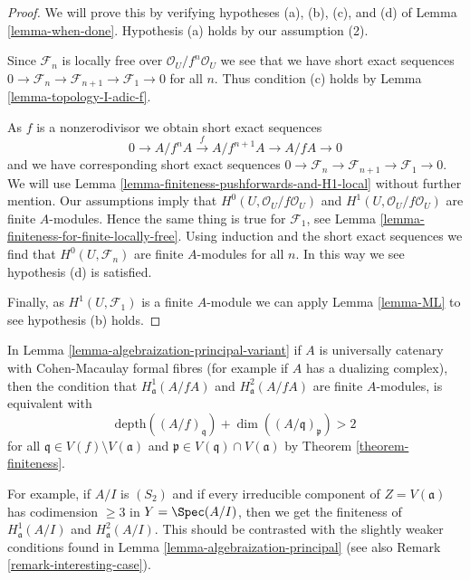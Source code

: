 \begin{proof}
We will prove this by verifying hypotheses (a), (b), (c), and (d) of
Lemma \ref{lemma-when-done}. Hypothesis (a) holds by our assumption (2).

\medskip\noindent
Since $\mathcal{F}_n$ is locally free over $\mathcal{O}_U/f^n\mathcal{O}_U$
we see that we have short exact sequences
$0 \to \mathcal{F}_n \to \mathcal{F}_{n + 1} \to \mathcal{F}_1 \to 0$
for all $n$. Thus condition (c) holds by Lemma \ref{lemma-topology-I-adic-f}.

\medskip\noindent
As $f$ is a nonzerodivisor we obtain short exact sequences
$$
0 \to A/f^nA \xrightarrow{f} A/f^{n + 1}A \to A/fA \to 0
$$
and we have corresponding short exact sequences
$0 \to \mathcal{F}_n \to \mathcal{F}_{n + 1} \to \mathcal{F}_1 \to 0$.
We will use Lemma \ref{lemma-finiteness-pushforwards-and-H1-local}
without further mention. Our assumptions imply that
$H^0(U, \mathcal{O}_U/f\mathcal{O}_U)$ and
$H^1(U, \mathcal{O}_U/f\mathcal{O}_U)$
are finite $A$-modules. Hence the same thing is true for $\mathcal{F}_1$, see
Lemma \ref{lemma-finiteness-for-finite-locally-free}.
Using induction and the short exact sequences we find that
$H^0(U, \mathcal{F}_n)$ are finite $A$-modules for all $n$.
In this way we see hypothesis (d) is satisfied.

\medskip\noindent
Finally, as $H^1(U, \mathcal{F}_1)$ is a finite $A$-module
we can apply Lemma \ref{lemma-ML} to see hypothesis (b) holds.
\end{proof}

\begin{remark}
\label{remark-interesting-case-variant}
In Lemma \ref{lemma-algebraization-principal-variant}
if $A$ is universally catenary with Cohen-Macaulay
formal fibres (for example if $A$ has a dualizing complex), then
the condition that
$H^1_\mathfrak a(A/fA)$ and $H^2_\mathfrak a(A/fA)$
are finite $A$-modules, is equivalent with
$$
\text{depth}((A/f)_\mathfrak q) + \dim((A/\mathfrak q)_\mathfrak p) > 2
$$
for all $\mathfrak q \in V(f) \setminus V(\mathfrak a)$
and $\mathfrak p \in V(\mathfrak q) \cap V(\mathfrak a)$
by Theorem \ref{theorem-finiteness}.

\medskip\noindent
For example, if $A/I$ is $(S_2)$ and if every irreducible
component of $Z = V(\mathfrak a)$ has codimension $\geq 3$
in $Y = \Spec(A/I)$, then we get the finiteness of
$H^1_\mathfrak a(A/I)$ and $H^2_\mathfrak a(A/I)$.
This should be contrasted with the slightly weaker conditions
found in Lemma \ref{lemma-algebraization-principal}
(see also Remark \ref{remark-interesting-case}).
\end{remark}




